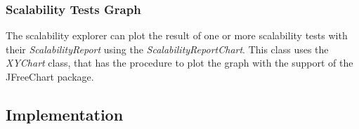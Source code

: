 \subsubsection{Scalability Tests Graph}
The scalability explorer can plot the result of one or more scalability tests with their \emph{ScalabilityReport} using the \emph{ScalabilityReportChart}. This class uses the \emph{XYChart} class, that has the procedure to plot the graph with the support of the JFreeChart package.


\subsection{Implementation}